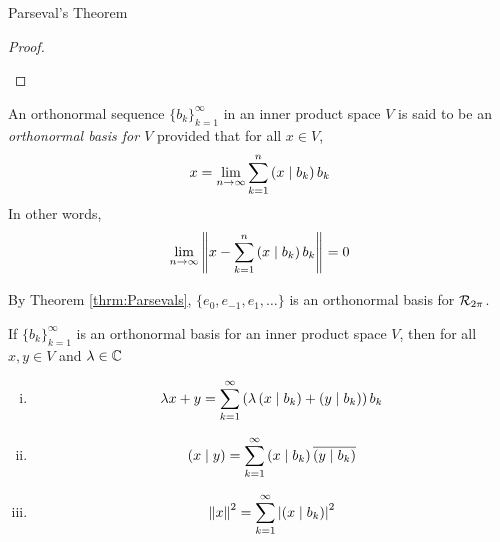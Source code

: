 \begin{section}{Parseval's Theorem}
\begin{proof}
\begin{enumerate}[{Case} i)]
	\end{enumerate}
\end{proof}


\begin{defn}
	An orthonormal sequence $\{b_k\}_{k=1}^\infty$ in an
	inner product space $V$ is said to be an \emph{orthonormal
	basis for $V$} provided that for all $x \in V$,
		\begin{displaymath}
			x = \lim_{n \rightarrow \infty} \sum_{k=1}^n
				\innrprod{x}{b_k}b_k
		\end{displaymath}
	In other words,
		\begin{displaymath}
			\lim_{n \rightarrow \infty} \norm[]
				{x-\sum_{k=1}^n \innrprod{x}{b_k}b_k}
				= 0
		\end{displaymath}
\end{defn}

\begin{ex}
	By Theorem \ref{thrm:Parsevals}, $\{e_0,e_{-1},e_1,\ldots\}$
	is an orthonormal basis for $\riemmint$.
\end{ex}


\begin{thrm}\label{thrm:OrthoBasis}
	If $\{b_k\}_{k=1}^\infty$ is an orthonormal basis for
	an inner product space $V$, then for all $x,y \in V$
	and $\iscmplx[\lambda]$
		\begin{enumerate}[i)]
			\item
				\begin{displaymath}
					\lambda x + y = \sum_{k=1}^\infty \left(
						\lambda \innrprod{x}{b_k} + \innrprod{y}{b_k}
						\right) b_k
				\end{displaymath}
			\item
				\begin{displaymath}
					\innrprod{x}{y} = \sum_{k=1}^\infty \innrprod{x}{b_k}
						\conj{\innrprod{y}{b_k}}
				\end{displaymath}
			\item
				\begin{displaymath}
					\norm[]{x}^2 = \sum_{k=1}^\infty \modulus{\innrprod{x}{b_k}}^2
				\end{displaymath}
		\end{enumerate}
\end{thrm}


\end{section}
